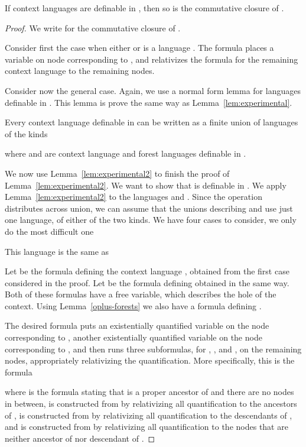 \documentclass{LMCS}
\begin{document}
\begin{lem}
  If context languages  are definable in \Stwo,  then so is the
  commutative closure of .
\end{lem}
\begin{proof} 
We write  for the commutative closure of .

Consider first the case when either  or  is a language . The formula places a variable on node corresponding to , and relativizes the formula for the remaining context language
to the remaining nodes. 

Consider now the general case. Again, we use a normal form lemma for languages definable in .  This lemma is prove the same way as Lemma~\ref{lem:experimental}.
\begin{lem}\label{lem:experimental2}
	Every context language  definable in  can be  written as  a finite union
	of languages of the kinds
	
	where  and  are context language and forest languages definable in
	\Stwo.	
\end{lem}


We now use Lemma~\ref{lem:experimental2} to finish the proof of Lemma~\ref{lem:experimental2}. We want to show that  is definable in . We apply Lemma~\ref{lem:experimental2} to the languages  and .
Since the operation  distributes across union, we can assume
that  the unions describing  and  use just one language, of either of the two kinds. We have four cases to consider, we only do the most difficult
one

This language is the same as 

Let  be the \Stwo formula defining the context language , 
obtained from the first case considered in the proof.  Let  be the \Stwo formula
defining  obtained in the same way. Both of these formulas have a free variable, which describes the hole of the context. Using
Lemma~\ref{oplus-forests} we also have a \Stwo formula 
defining .


The desired \Stwo formula puts an existentially quantified variable  on the
node corresponding to , another existentially quantified
variable  on the node corresponding to , and then runs
three subformulas, for , , and , on the remaining nodes, appropriately relativizing the quantification. More specifically, this is the formula

where  is the  formula stating that  is a proper ancestor of  and there are no nodes in between,  is constructed from  by relativizing
all quantification to the ancestors of ,  is constructed from  by relativizing
all quantification to the descendants of , and  is
constructed from  by relativizing all quantification to the
nodes that are neither ancestor of  nor descendant of .
\end{proof}
\end{document}
